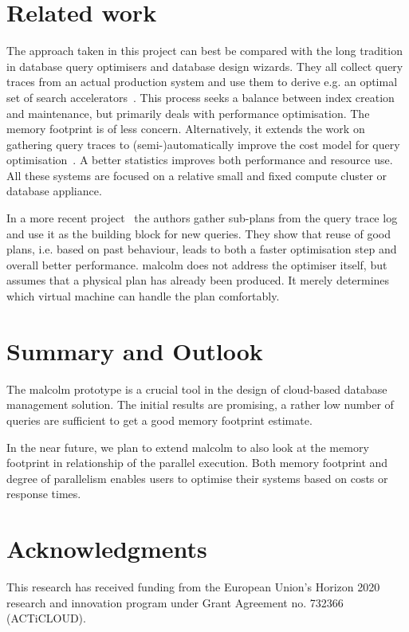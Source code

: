 \documentclass[conference]{IEEEtran}
\begin{document}
\section{Related work}
The approach taken in this project can best be compared with the long tradition in database query optimisers and database design wizards.
They all collect query traces from an actual production system and use them to derive e.g. an optimal set of search accelerators~\cite{DBLP:conf/vldb/ChaudhuriN07}.
This process seeks a balance between index creation and maintenance, but primarily deals with performance optimisation.
The memory footprint is of less concern.
Alternatively, it extends the work on gathering query traces to (semi-)automatically improve the cost model for query optimisation~\cite{DBLP:journals/ibmsj/MarklLR03}.
A better statistics improves both performance and resource use.
All these systems are focused on a relative small and fixed compute cluster or database appliance.

In a more recent project~\cite{DBLP:journals/pvldb/DingDWCN18} the authors gather sub-plans from the query trace log and use it as the building block for new queries.
They show that reuse of good plans, i.e. based on past behaviour, leads to both a faster optimisation step and overall better performance.
{\sc malcolm} does not address the optimiser itself, but assumes that a physical plan has already been produced.
It merely determines which virtual machine can handle the plan comfortably.

\section{Summary and Outlook\label{summary}} 
The {\sc malcolm} prototype is a crucial tool in the design of cloud-based database management solution.
The initial results are promising, a rather low number of queries are sufficient to get a good memory footprint estimate.

In the near future, we plan to extend {\sc malcolm} to also look at the memory footprint in relationship of the parallel execution.
Both memory footprint and degree of parallelism enables users to optimise their systems based on costs or response times.


\balance

\section*{Acknowledgments}
This research has received funding from the European Union's Horizon 2020 research and innovation program under Grant Agreement no. 732366 (ACTiCLOUD).


\end{document}
